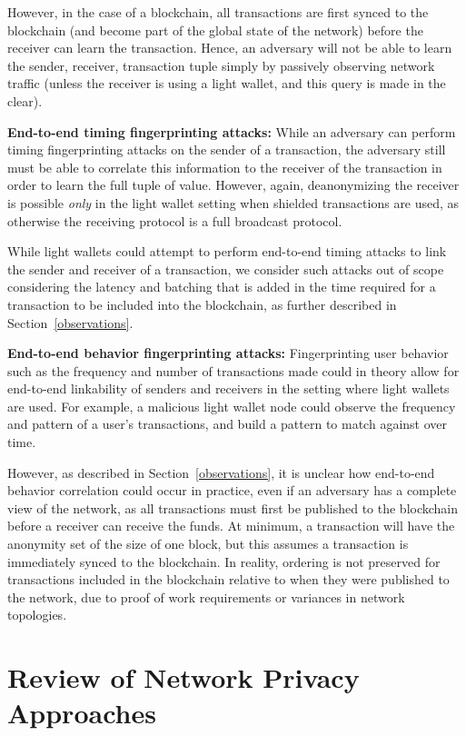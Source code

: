\documentclass{article}
\begin{document}
However, in the case of a blockchain, all transactions are first synced to the
blockchain (and become part of the global state of the network) before the
receiver can learn the transaction. Hence, an adversary
will not be able to learn the sender, receiver, transaction tuple simply by
passively observing network traffic (unless the receiver is using a light
wallet, and this query is made in the clear).

\textbf{End-to-end timing fingerprinting attacks:}
While an adversary can perform timing fingerprinting attacks on the sender of a
transaction, the adversary still must be able to correlate this information to
the receiver of the transaction in order to learn the full tuple of value.
However, again, deanonymizing the receiver is possible
\emph{only} in the light wallet setting when shielded transactions are used, as
otherwise the receiving protocol is a full broadcast protocol.

While light wallets could attempt to perform end-to-end timing attacks to link
the sender and receiver of a transaction, we
consider such attacks out of scope considering the latency and batching that is
added in the time required for a transaction to be included into the
blockchain, as further described in Section~\ref{observations}.

\textbf{End-to-end behavior fingerprinting attacks:}
Fingerprinting user behavior such as the frequency and number of transactions
made could in theory allow for end-to-end linkability of senders and receivers
in the setting where light wallets are used.
For example, a malicious light wallet node could observe
the frequency and pattern of a user’s transactions, and build a pattern to
match against over time.

However, as described in Section~\ref{observations}, it is unclear how
end-to-end behavior correlation could occur in practice, even if an adversary has a
complete view of the network, as all transactions must first be
published to the blockchain before a receiver can receive the funds. At minimum, a
transaction will have the anonymity set of the size of one block, but this
assumes a transaction is immediately synced to the blockchain. In reality,
ordering is not preserved for transactions included in the blockchain relative
to when they were published to the network, due to proof of work
requirements or variances in network topologies.


\section{Review of Network Privacy Approaches}
\label{network-privacy-review}
\end{document}
